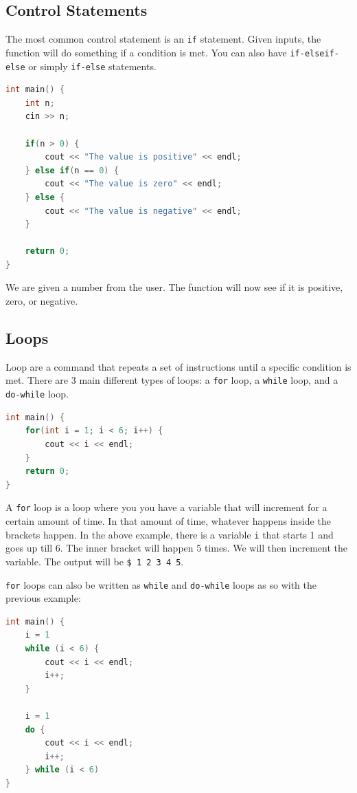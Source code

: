 \documentclass[11pt]{article}
\begin{document}
\subsection{Control Statements}
\noindent The most common control statement is an \texttt{if} statement. Given inputs, the function will do something if a condition is met. You can also have \texttt{if-elseif-else} or simply \texttt{if-else} statements.

\begin{lstlisting}[language=c, mathescape=true]
int main() {
    int n;
    cin >> n;

    if(n > 0) {
        cout << "The value is positive" << endl;
    } else if(n == 0) {
        cout << "The value is zero" << endl;
    } else {
        cout << "The value is negative" << endl;
    }

    return 0;
}
\end{lstlisting}

\noindent We are given a number from the user. The function will now see if it is positive, zero, or negative.

\subsection{Loops}
\noindent Loop are a command that repeats a set of instructions until a specific condition is met. There are 3 main different types of loops: a \texttt{for} loop, a \texttt{while} loop, and a \texttt{do-while} loop.

\begin{lstlisting}[language=c, mathescape=true]
int main() {
    for(int i = 1; i < 6; i++) {
        cout << i << endl;
    }
    return 0;
}
\end{lstlisting}

\noindent A \texttt{for} loop is a loop where you you have a variable that will increment for a certain amount of time. In that amount of time, whatever happens inside the brackets happen. In the above example, there is a variable \texttt{i} that starts 1 and goes up till 6. The inner bracket will happen 5 times. We will then increment the variable. The output will be \texttt{\$ 1 2 3 4 5}.

\noindent \texttt{for} loops can also be written as \texttt{while} and \texttt{do-while} loops as so with the previous example:

\begin{lstlisting}[language=c, mathescape=true]
int main() {
    i = 1
    while (i < 6) {
        cout << i << endl;
        i++;
    }

    i = 1
    do {
        cout << i << endl;
        i++;
    } while (i < 6)
}
\end{lstlisting}
\end{document}
